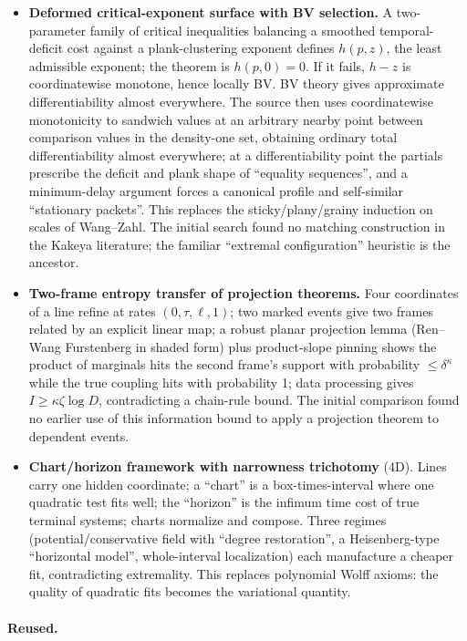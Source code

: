 \documentclass[11pt]{article}
\begin{document}
\begin{itemize}
\item \textbf{Deformed critical-exponent surface with BV selection.} A two-parameter family of critical inequalities balancing a smoothed temporal-deficit cost against a plank-clustering exponent defines $h(p,z)$, the least admissible exponent; the theorem is $h(p,0)=0$. If it fails, $h-z$ is coordinatewise monotone, hence locally BV. BV theory gives approximate differentiability almost everywhere. The source then uses coordinatewise monotonicity to sandwich values at an arbitrary nearby point between comparison values in the density-one set, obtaining ordinary total differentiability almost everywhere; at a differentiability point the partials prescribe the deficit and plank shape of ``equality sequences'', and a minimum-delay argument forces a canonical profile and self-similar ``stationary packets''. This replaces the sticky/plany/grainy induction on scales of Wang--Zahl. The initial search found no matching construction in the Kakeya literature; the familiar ``extremal configuration'' heuristic is the ancestor.
\item \textbf{Two-frame entropy transfer of projection theorems.} Four coordinates of a line refine at rates $(0,\tau,\ell,1)$; two marked events give two frames related by an explicit linear map; a robust planar projection lemma (Ren--Wang Furstenberg in shaded form) plus product-slope pinning shows the product of marginals hits the second frame's support with probability $\le\delta^\kappa$ while the true coupling hits with probability 1; data processing gives $I\ge\kappa\zeta\log D$, contradicting a chain-rule bound. The initial comparison found no earlier use of this information bound to apply a projection theorem to dependent events.
\item \textbf{Chart/horizon framework with narrowness trichotomy} (4D). Lines carry one hidden coordinate; a ``chart'' is a box-times-interval where one quadratic test fits well; the ``horizon'' is the infimum time cost of true terminal systems; charts normalize and compose. Three regimes (potential/conservative field with ``degree restoration'', a Heisenberg-type ``horizontal model'', whole-interval localization) each manufacture a cheaper fit, contradicting extremality. This replaces polynomial Wolff axioms: the quality of quadratic fits becomes the variational quantity.
\end{itemize}

\paragraph{Reused.}
\end{document}
